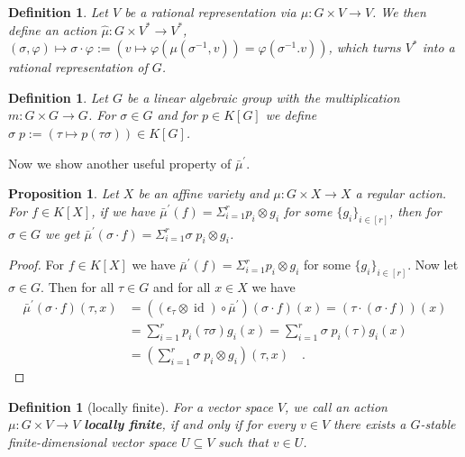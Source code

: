 \message{ !name(roughdraft.tex)}\documentclass[a4paper]{article}
\theoremstyle{prrt}
\newtheorem{definition}[theorem]{Definition}
\newtheorem{proposition}[theorem]{Proposition}
\begin{document}
\begin{definition}\label{back}
  Let $V$ be a rational representation via $\mu \colon G \times V \rightarrow V$.
  We then define an action $\hat{\mu} \colon G \times V^\ast \rightarrow V^\ast$, $ (\sigma,\varphi) \mapsto \sigma\cdot \varphi := (v \mapsto \varphi(\mu(\sigma^{-1},v)) = \varphi(\sigma^{-1}.v))$, which turns $V^\ast$ into a rational representation of $G$.
\end{definition}

\begin{definition}\label{rac}
  Let $G$ be a linear algebraic group with the multiplication $m \colon G \times G \rightarrow G$.
  For $\sigma \in G$ and for $p \in K[G]$ we define $\sigma\dot{\phantom{.}}p := (\tau \mapsto p(\tau\sigma)) \in K[G]$.
\end{definition}

Now we show another useful property of $\bar{\mu}^\prime$.

\begin{proposition}\label{roro}
  Let $X$ be an affine variety and $\mu \colon G \times X \rightarrow X$ a regular action.
  For $f \in K[X]$, if we have $\bar{\mu}^\prime (f) = \Sigma_{i = 1}^r p_i \otimes g_i$ for some $\{g_i\}_{i\in [r]}$, then for $\sigma \in G$ we get $\bar{\mu}^\prime (\sigma\cdot f) = \Sigma_{i = 1}^r \sigma \dot{\phantom{.}} p_i \otimes g_i$.
\end{proposition}

\begin{proof}
  For $f \in K[X]$ we have $ \bar{\mu}^\prime (f) = \Sigma_{i=1}^r p_i \otimes g_i$ for some $\{g_i\}_{i \in [r]}$.
  Now let $\sigma \in G$.
  Then for all $\tau \in G$ and for all $x \in X$ we have
  \begin{equation}
    \begin{aligned}
      \bar{\mu}^\prime (\sigma\cdot f) (\tau,x)
      &=((\epsilon_\tau \otimes \operatorname{id}) \circ \bar{\mu}^\prime) (\sigma\cdot f) (x)
      =(\tau\cdot (\sigma\cdot f)) (x)\\
      &=\sum_{i=1}^r p_i(\tau\sigma) g_i(x)
      =\sum_{i=1}^r \sigma\dot{\phantom{.}}p_i(\tau) g_i(x)\\
      &=(\sum_{i=1}^r \sigma \dot{\phantom{.}}p_i \otimes g_i) (\tau,x) \quad .
    \end{aligned}
  \end{equation}
\end{proof}

\begin{definition}[locally finite]
  For a vector space $V$, we call an action $\mu \colon G \times V \rightarrow V$ \textbf{locally finite}, if and only if for every $v \in V$ there exists a $G$-stable finite-dimensional vector space $U \subseteq V$ such that $v \in U$.
\end{definition}
\end{document}
